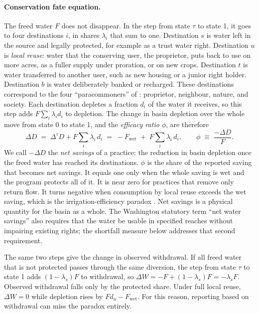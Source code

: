 \documentclass[11pt]{article}
\newcommand{\Fwet}{F_{\mathrm{wet}}}        %
\newcommand{\dtau}{\Delta^{\tau}}            %
\begin{document}
\paragraph{Conservation fate equation.} The freed water $F$ does not disappear. In the step from state $\tau$ to state 1, it goes to four destinations $i$, in shares $\lambda_i$ that sum to one. Destination $s$ is water left in the source and legally protected, for example as a trust water right. Destination $u$ is \emph{local reuse}: water that the conserving user, the proprietor, puts back to use on more acres, as a fuller supply under proration, or on new crops. Destination $t$ is water transferred to another user, such as new housing or a junior right holder. Destination $b$ is water deliberately banked or recharged. These destinations correspond to the four ``paracommoners'' of \citet{lankford2023}: proprietor, neighbour, nature, and society. Each destination depletes a fraction $d_i$ of the water it receives, so this step adds $F \sum_i \lambda_i d_i$ to depletion. The change in basin depletion over the whole move from state 0 to state 1, and the \emph{efficacy ratio} $\phi$, are therefore
\begin{equation}\label{eq:fate}
  \Delta D \;=\; \dtau D + F \sum_i \lambda_i\, d_i \;=\; -\Fwet \;+\; F \sum_i \lambda_i\, d_i ,
  \qquad
  \phi \;\equiv\; \frac{-\Delta D}{F} .
\end{equation}
We call $-\Delta D$ the \emph{net savings} of a practice: the reduction in basin depletion once the freed water has reached its destinations. $\phi$ is the share of the reported saving that becomes net savings. It equals one only when the whole saving is wet and the program protects all of it. It is near zero for practices that remove only return flow. It turns negative when consumption by local reuse exceeds the wet saving, which is the irrigation-efficiency paradox \citep{grafton2018}. Net savings is a physical quantity for the basin as a whole. The Washington statutory term ``net water savings'' \citep{rcw9042020} also requires that the water be usable in specified reaches without impairing existing rights; the shortfall measure below addresses that second requirement.

The same two steps give the change in observed withdrawal. If all freed water that is not protected passes through the same diversion, the step from state $\tau$ to state 1 adds $(1-\lambda_s)F$ to withdrawal, so $\Delta W = -F + (1-\lambda_s)F = -\lambda_s F$. Observed withdrawal falls only by the protected share. Under full local reuse, $\Delta W = 0$ while depletion rises by $F d_u - \Fwet$. For this reason, reporting based on withdrawal can miss the paradox entirely.
\end{document}
